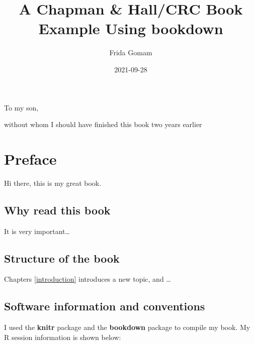 \documentclass[
]{krantz}
\title{A Chapman \& Hall/CRC Book Example Using bookdown}
\author{Frida Gomam}
\date{2021-09-28}
\begin{document}
\maketitle


\thispagestyle{empty}

\begin{center}
To my son,

without whom I should have finished this book two years earlier
\end{center}

\setlength{\abovedisplayskip}{-5pt}
\setlength{\abovedisplayshortskip}{-5pt}

{
\hypersetup{linkcolor=}
\setcounter{tocdepth}{2}
\tableofcontents
}
\listoftables
\listoffigures
\hypertarget{preface}{%
\chapter*{Preface}\label{preface}}


Hi there, this is my great book.

\hypertarget{why-read-this-book}{%
\section*{Why read this book}\label{why-read-this-book}}


It is very important\ldots{}

\hypertarget{structure-of-the-book}{%
\section*{Structure of the book}\label{structure-of-the-book}}


Chapters \ref{introduction} introduces a new topic, and \ldots{}

\hypertarget{software-information-and-conventions}{%
\section*{Software information and conventions}\label{software-information-and-conventions}}


I used the \textbf{knitr} package \citep{xie2015} and the \textbf{bookdown} package \citep{R-bookdown} to compile my book. My R session information is shown below:
\end{document}
